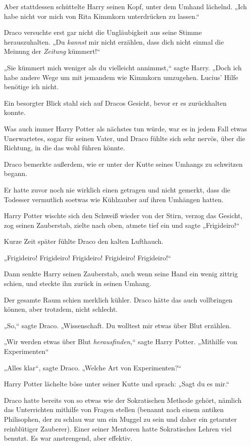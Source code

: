 {Aber stattdessen schüttelte Harry seinen Kopf, unter dem Umhand lächelnd. „Ich habe nicht vor mich von Rita Kimmkorn unterdrücken zu lassen.“

Draco versuchte erst gar nicht die Ungläubigkeit aus seine Stimme herauszuhalten. „Du \emph{kannst} mir nicht erzählen, dass dich nicht einmal die Meinung der \emph{Zeitung} kümmert!“

„Sie kümmert mich weniger als du vielleicht annimmst,“ sagte Harry. „Doch ich habe andere Wege um mit jemandem wie Kimmkorn umzugehen. Lucius' Hilfe benötige ich nicht.

Ein besorgter Blick stahl sich auf Dracos Gesicht, bevor er es zurückhalten konnte.

Was auch immer Harry Potter als nächstes tun würde, war es in jedem Fall etwas Unerwartetes, sogar für seinen Vater, und Draco fühlte sich sehr nervös, über die Richtung, in die das wohl führen könnte.

Draco bemerkte außerdem, wie er unter der Kutte seines Umhangs zu schwitzen begann.

Er hatte zuvor noch nie wirklich einen getragen und nicht gemerkt, dass die Todesser vermutlich soetwas wie Kühlzauber auf ihren Umhängen hatten.

Harry Potter wischte sich den Schweiß wieder von der Stirn, verzog das Gesicht, zog seinen Zauberstab, zielte nach oben, atmete tief ein und sagte „Frigideiro!“

Kurze Zeit später fühlte Draco den kalten Lufthauch.

„Frigideiro! Frigideiro! Frigideiro! Frigideiro! Frigideiro!“

Dann senkte Harry seinen Zauberstab, auch wenn seine Hand ein wenig zittrig schien, und steckte ihn zurück in seinen Umhang.

Der gesamte Raum schien merklich kühler. Draco hätte das auch vollbringen können, aber trotzdem, nicht schlecht.

„So,“ sagte Draco. „Wissenschaft. Du wolltest mir etwas über Blut erzählen.

„Wir werden etwas über Blut \emph{herausfinden,}“ sagte Harry Potter. „Mithilfe von Experimenten“

„Alles klar“, sagte Draco. „Welche Art von Experimenten?“

Harry Potter lächelte böse unter seiner Kutte und sprach: „Sagt du es mir.“

Draco hatte bereits von so etwas wie der Sokratischen Methode gehört, nämlich das Unterrichten mithilfe von Fragen stellen (benannt nach einem antiken Philisophen, der zu schlau war um ein Muggel zu sein und daher ein getarnter reinblütiger Zauberer). Einer seiner Mentoren hatte Sokratisches Lehren viel benutzt. Es war anstrengend, aber effektiv.

}
